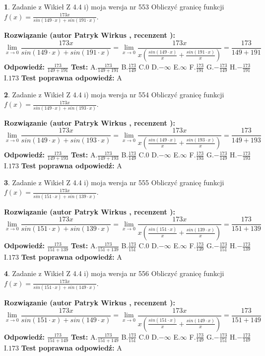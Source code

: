 \documentclass[12pt, a4paper]{article}
\theoremstyle{definition} %
\newtheorem{zad}{}
\newcommand{\zadStart}[1]{\begin{zad}#1\newline}
\newcommand{\zadStop}{\end{zad}}
\newcommand{\rozwStart}[2]{\noindent \textbf{Rozwiązanie (autor #1 , recenzent #2): }\newline}
\newcommand{\rozwStop}{\newline}
\newcommand{\odpStart}{\noindent \textbf{Odpowiedź:}\newline}
\newcommand{\odpStop}{\newline}
\newcommand{\testStart}{\noindent \textbf{Test:}\newline}
\newcommand{\testStop}{\newline}
\newcommand{\kluczStart}{\noindent \textbf{Test poprawna odpowiedź:}\newline}
\newcommand{\kluczStop}{\newline}
\begin{document}
\zadStart{Zadanie z Wikieł Z 4.4 i) moja wersja nr 553}
Obliczyć granicę funkcji $f(x)=\frac{173x}{sin(149\cdot x) +sin(191\cdot x)}$.
\zadStop
\rozwStart{Patryk Wirkus}{}
$$\lim\limits_{x\to 0}\frac{173x}{sin(149\cdot x) +sin(191\cdot x)}=\lim\limits_{x\to 0}\frac{173x}{x(\frac{sin(149\cdot x)}{x}+\frac{sin(191\cdot x)}{x})}=\frac{173}{149+191}$$
\rozwStop
\odpStart
$\frac{173}{149+191}$
\odpStop
\testStart
A.$\frac{173}{149+191}$
B.$\frac{173}{149}$
C.$0$
D.$-\infty$
E.$\infty$
F.$\frac{173}{191}$
G.$-\frac{173}{149}$
H.$-\frac{173}{191}$
I.$173$
\testStop
\kluczStart
A
\kluczStop



\zadStart{Zadanie z Wikieł Z 4.4 i) moja wersja nr 554}
Obliczyć granicę funkcji $f(x)=\frac{173x}{sin(149\cdot x) +sin(193\cdot x)}$.
\zadStop
\rozwStart{Patryk Wirkus}{}
$$\lim\limits_{x\to 0}\frac{173x}{sin(149\cdot x) +sin(193\cdot x)}=\lim\limits_{x\to 0}\frac{173x}{x(\frac{sin(149\cdot x)}{x}+\frac{sin(193\cdot x)}{x})}=\frac{173}{149+193}$$
\rozwStop
\odpStart
$\frac{173}{149+193}$
\odpStop
\testStart
A.$\frac{173}{149+193}$
B.$\frac{173}{149}$
C.$0$
D.$-\infty$
E.$\infty$
F.$\frac{173}{193}$
G.$-\frac{173}{149}$
H.$-\frac{173}{193}$
I.$173$
\testStop
\kluczStart
A
\kluczStop



\zadStart{Zadanie z Wikieł Z 4.4 i) moja wersja nr 555}
Obliczyć granicę funkcji $f(x)=\frac{173x}{sin(151\cdot x) +sin(139\cdot x)}$.
\zadStop
\rozwStart{Patryk Wirkus}{}
$$\lim\limits_{x\to 0}\frac{173x}{sin(151\cdot x) +sin(139\cdot x)}=\lim\limits_{x\to 0}\frac{173x}{x(\frac{sin(151\cdot x)}{x}+\frac{sin(139\cdot x)}{x})}=\frac{173}{151+139}$$
\rozwStop
\odpStart
$\frac{173}{151+139}$
\odpStop
\testStart
A.$\frac{173}{151+139}$
B.$\frac{173}{151}$
C.$0$
D.$-\infty$
E.$\infty$
F.$\frac{173}{139}$
G.$-\frac{173}{151}$
H.$-\frac{173}{139}$
I.$173$
\testStop
\kluczStart
A
\kluczStop



\zadStart{Zadanie z Wikieł Z 4.4 i) moja wersja nr 556}
Obliczyć granicę funkcji $f(x)=\frac{173x}{sin(151\cdot x) +sin(149\cdot x)}$.
\zadStop
\rozwStart{Patryk Wirkus}{}
$$\lim\limits_{x\to 0}\frac{173x}{sin(151\cdot x) +sin(149\cdot x)}=\lim\limits_{x\to 0}\frac{173x}{x(\frac{sin(151\cdot x)}{x}+\frac{sin(149\cdot x)}{x})}=\frac{173}{151+149}$$
\rozwStop
\odpStart
$\frac{173}{151+149}$
\odpStop
\testStart
A.$\frac{173}{151+149}$
B.$\frac{173}{151}$
C.$0$
D.$-\infty$
E.$\infty$
F.$\frac{173}{149}$
G.$-\frac{173}{151}$
H.$-\frac{173}{149}$
I.$173$
\testStop
\kluczStart
A
\kluczStop
\end{document}
